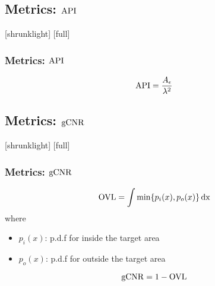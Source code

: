 \subsection{Metrics: $\operatorname{API}$}
[shrunklight]
[full]
\begin{frame}[t]
\frametitle{Metrics: $\operatorname{API}$}
	\begin{equation*}
		\operatorname{API} = \frac{A_{\epsilon}}{\lambda^{2}} 
	\end{equation*}
\end{frame}


\subsection{Metrics: $\operatorname{gCNR}$}
[shrunklight]
[full]
\begin{frame}[t]
\frametitle{Metrics: $\operatorname{gCNR}$}
	\begin{equation*}
		\operatorname{OVL} = \int \min \{ p_i (x), p_o (x) \} \operatorname{dx}
	\end{equation*}
	where
	\begin{itemize}
		\item $p_i (x)$: p.d.f for inside the target area
		\item $p_o (x)$: p.d.f for outside the target area
	\end{itemize}
	\vspace*{0.5cm}
	\begin{equation*}
		\operatorname{gCNR} = 1 - \operatorname{OVL}
	\end{equation*}
\end{frame}

